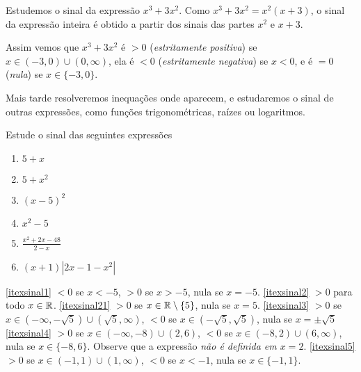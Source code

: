 \begin{ex}
Estudemos o sinal da expressão $x^3+3x^2$.
Como $x^3+3x^2=x^2(x+3)$, o sinal da expressão inteira é obtido a partir dos sinais das
partes $x^2$ e $x+3$.
\begin{center}
\begin{bmlimage}\end{bmlimage}
\end{center}
Assim vemos que $x^3+3x^2$ é $>0$ (\emph{estritamente positiva}) se $x\in (-3,0)\cup
(0,\infty)$, ela é $<0$ (\emph{estritamente negativa}) se $x<0$, e é $=0$ (\emph{nula})
se $x\in \{-3,0\}$.
\end{ex}

Mais tarde resolveremos inequações onde aparecem, e estudaremos o sinal de outras
expressões, como funções trigonométricas, raízes ou logaritmos.

\begin{exo}
Estude o sinal das seguintes expressões
\begin{multicols}{3}
\begin{enumerate}
\item\label{itexsinal1} $5+x$
\item\label{itexsinal2} $5+x^2$
\item\label{itexsinal21} $(x-5)^2$
\item\label{itexsinal3} $x^2-5$
\item\label{itexsinal4} $\frac{x^2+2x-48}{2-x}$
\item\label{itexsinal5} $(x+1)|2x-1-x^2|$
\end{enumerate}
\end{multicols}
\vspace{0.01cm}
\begin{sol}
\eqref{itexsinal1} $<0$ se $x<-5$, $>0$ se $x>-5$, nula se $x=-5$.
\eqref{itexsinal2} $>0$ para todo $x\in \mathbb{R}$.
\eqref{itexsinal21} $>0$ se $x\in\mathbb{R}\setminus \{5\}$, nula se $x=5$.
\eqref{itexsinal3} $>0$ se $x\in (-\infty,-\sqrt{5})\cup (\sqrt{5},\infty)$, $<0$ se
$x\in (-\sqrt{5},\sqrt{5})$, nula se $x=\pm \sqrt{5}$
\eqref{itexsinal4} $>0$ se $x\in (-\infty,-8)\cup (2,6)$, $<0$ se $x\in (-8,2)\cup
(6,\infty)$, nula se $x\in \{-8,6\}$. Observe que a expressão \emph{não é definida em
$x=2$}.
\eqref{itexsinal5} $>0$ se $x\in (-1,1)\cup(1,\infty)$, $<0$ se $x<-1$, nula se $x\in
\{-1,1\}$.
\end{sol}
\end{exo}


